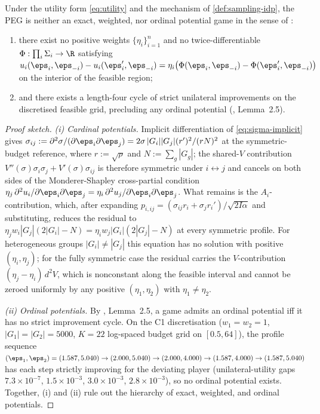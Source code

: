 \begin{proposition}
\label{prop:non-potential}
Under the utility form \eqref{eq:utility} and the mechanism of
\cref{def:sampling-idp}, the PEG is neither an exact, weighted, nor
ordinal potential game in the sense of \citet{monderer1996potential}:
\begin{enumerate}
  \item[\rm(i)] there exist no positive weights $\{\eta_i\}_{i=1}^n$
        and no twice-differentiable $\Phi:\prod_i\Sigma_i \to \R$
        satisfying $u_i(\eps_i,\boldsymbol{\eps}_{-i}) -
        u_i(\eps_i',\boldsymbol{\eps}_{-i}) = \eta_i\bigl(
        \Phi(\eps_i,\boldsymbol{\eps}_{-i}) -
        \Phi(\eps_i',\boldsymbol{\eps}_{-i})\bigr)$
        on the interior of the feasible region;
  \item[\rm(ii)] and there exists a length-four cycle of strict
        unilateral improvements on the discretised feasible grid,
        precluding any ordinal potential (\cite{monderer1996potential},
        Lemma~2.5).
\end{enumerate}
\end{proposition}

\begin{proof}[Proof sketch]
\emph{(i) Cardinal potentials.} Implicit differentiation of
\eqref{eq:sigma-implicit} gives
$\sigma_{ij} := \partial^2\sigma/(\partial\eps_i\partial\eps_j)
= 2\sigma\,|G_i||G_j|(r')^2/(rN)^2$
at the symmetric-budget reference, where $r := \sqrt{\rho}$ and
$N := \sum_g|G_g|$; the shared-$V$ contribution
$V''(\sigma)\sigma_i\sigma_j + V'(\sigma)\sigma_{ij}$ is therefore
symmetric under $i\leftrightarrow j$ and cancels on both sides of the
Monderer-Shapley cross-partial condition
$\eta_j\, \partial^2 u_i / \partial\eps_i\partial\eps_j
= \eta_i\, \partial^2 u_j / \partial\eps_i\partial\eps_j$. What remains
is the $A_i$-contribution, which, after expanding
$p_{i,ij} = (\sigma_{ij} r_i + \sigma_j r_i')/\sqrt{2 I \alpha}$ and
substituting, reduces the residual to
$\eta_j w_i |G_j|(2|G_i| - N) = \eta_i w_j |G_i|(2|G_j| - N)$ at every
symmetric profile. For heterogeneous groups $|G_i|\neq|G_j|$ this
equation has no solution with positive $(\eta_i, \eta_j)$; for the fully
symmetric case the residual carries the $V$-contribution
$(\eta_j - \eta_i)\,d^2 V$, which is nonconstant along the feasible
interval and cannot be zeroed uniformly by any positive
$(\eta_1,\eta_2)$ with $\eta_1 \neq \eta_2$.

\emph{(ii) Ordinal potentials.} By \citet{monderer1996potential},
Lemma~2.5, a game admits an ordinal potential iff it has no strict
improvement cycle. On the C1 discretisation ($w_1=w_2=1$, $|G_1|=|G_2|=5000$,
$K=22$ log-spaced budget grid on $[0.5,64]$), the profile sequence
$(\eps_1,\eps_2) = (1.587,5.040) \to (2.000,5.040) \to (2.000,4.000)
\to (1.587,4.000) \to (1.587,5.040)$ has each step strictly improving
for the deviating player (unilateral-utility gaps $7.3\!\times\!10^{-7}$,
$1.5\!\times\!10^{-3}$, $3.0\!\times\!10^{-3}$, $2.8\!\times\!10^{-3}$),
so no ordinal potential exists. Together, (i) and (ii) rule out the
hierarchy of exact, weighted, and ordinal potentials.
\end{proof}

